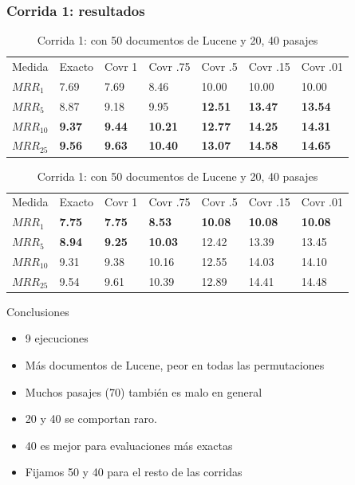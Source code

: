 \begin{frame}
\frametitle{Corrida 1: resultados}


\begin{table}
\centering
\begin{center}
\begin{tabular}{|l | l | l | l | l | l | l |}

Medida & Exacto & Covr 1 & Covr .75 & Covr .5 & Covr .15 & Covr .01 \\ 
$MRR_{1}$ & 7.69 & 7.69 & 8.46 & 10.00 & 10.00 & 10.00  \\ 
$MRR_{5}$ & 8.87 & 9.18 & 9.95 & \textbf{12.51} & \textbf{13.47} & \textbf{13.54}  \\ 
$MRR_{10}$ & \textbf{9.37} & \textbf{9.44} & \textbf{10.21} & \textbf{12.77} & \textbf{14.25} & \textbf{14.31}  \\ 
$MRR_{25}$ & \textbf{9.56} & \textbf{9.63} & \textbf{10.40} & \textbf{13.07} & \textbf{14.58} & \textbf{14.65}  \\ 
\end{tabular}

\medskip
\medskip

\begin{tabular}{|l | l | l | l | l | l | l |}
Medida & Exacto & Covr 1 & Covr .75 & Covr .5 & Covr .15 & Covr .01 \\ 
$MRR_{1}$ & \textbf{7.75} & \textbf{7.75} & \textbf{8.53} & \textbf{10.08} & \textbf{10.08} & \textbf{10.08}  \\ 
$MRR_{5}$ & \textbf{8.94} & \textbf{9.25} & \textbf{10.03} & 12.42 & 13.39 & 13.45  \\ 
$MRR_{10}$ & 9.31 & 9.38 & 10.16 & 12.55 & 14.03 & 14.10  \\ 
$MRR_{25}$ & 9.54 & 9.61 & 10.39 & 12.89 & 14.41 & 14.48  \\ 
\end{tabular}
\caption{Corrida 1: con 50 documentos de Lucene y 20, 40 pasajes}
\label{table:1_50_getExactMRRWikiFactoid_getCovrMRRWikiFactoid}
\end{center}
\end{table}


Conclusiones
\begin{itemize}
  \item 9 ejecuciones
  \item Más documentos de Lucene, peor en todas las permutaciones
  \item Muchos pasajes (70) también es malo en general
  \item 20 y 40 se comportan raro. 
  \item 40 es mejor para evaluaciones más exactas
  \item Fijamos 50 y 40 para el resto de las corridas
\end{itemize}

\end{frame}




